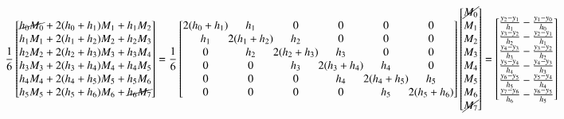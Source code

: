 \documentclass[10pt,a4paper]{article}
\begin{document}
		\begin{align*}\frac{1}{6}
		\begin{bmatrix}
			\cancel{h_0 M_0}+2(h_0+h_{1})M_{1}+h_{1} M_{2} \\
			h_1 M_1+2(h_1+h_{2})M_{2}+h_{2} M_{3} \\
			h_2 M_2+2(h_2+h_{3})M_{3}+h_{3} M_{4} \\
			h_3 M_3+2(h_3+h_{4})M_{4}+h_{4} M_{5} \\
			h_4 M_4+2(h_4+h_{5})M_{5}+h_{5} M_{6} \\
			h_5 M_5+2(h_5+h_{6})M_{6}+\cancel{h_{6} M_{7}}
		\end{bmatrix} = \frac{1}{6} 
		\begingroup %
		\setlength\arraycolsep{0pt}
		\begin{bmatrix}
			2(h_0+h_1) & h_1        & 0          & 0          & 0          & 0          \\
			h_1        & 2(h_1+h_2) & h_2        & 0          & 0          & 0          \\
			0          & h_2        & 2(h_2+h_3) & h_3        & 0          & 0          \\
			0          & 0          & h_3        & 2(h_3+h_4) & h_4        & 0          \\
			0          & 0          & 0          & h_4        & 2(h_4+h_5) & h_5        \\
			0          & 0          & 0          & 0          & h_5        & 2(h_5+h_6)
		\end{bmatrix}
		\endgroup
			\begin{bmatrix}
				\cancel{M_0} \\
				M_1 \\
				M_2 \\
				M_3 \\
				M_4 \\
				M_5 \\
				M_6 \\
				\cancel{M_7}
			\end{bmatrix}
			=
			\begin{bmatrix}
				\frac{y_2-y_1}{h_1}-\frac{y_1-y_0}{h_0} \\
				\frac{y_3-y_2}{h_2}-\frac{y_2-y_1}{h_1} \\
				\frac{y_4-y_3}{h_3}-\frac{y_3-y_2}{h_2} \\
				\frac{y_5-y_4}{h_4}-\frac{y_4-y_3}{h_3} \\
				\frac{y_6-y_5}{h_5}-\frac{y_5-y_4}{h_4} \\
				\frac{y_7-y_6}{h_6}-\frac{y_6-y_5}{h_5}
			\end{bmatrix}
		\end{align*}
\end{document}
